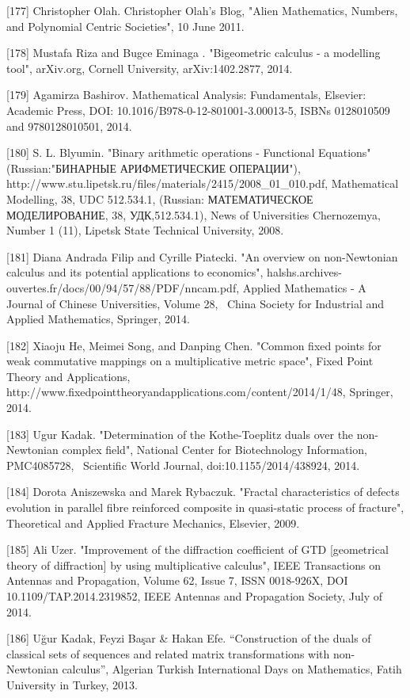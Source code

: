 \documentclass[12pt]{article}
\begin{document}
[177] Christopher Olah. Christopher Olah's Blog, "Alien Mathematics, Numbers, and Polynomial Centric Societies", 10 June 2011.

[178] Mustafa Riza and Bugce Eminaga . "Bigeometric calculus - a modelling tool", arXiv.org, Cornell University, arXiv:1402.2877, 2014.

[179] Agamirza Bashirov. Mathematical Analysis: Fundamentals, Elsevier: Academic Press, DOI: 10.1016/B978-0-12-801001-3.00013-5, ISBNs 0128010509 and 9780128010501, 2014.

[180] S. L. Blyumin. "Binary arithmetic operations - Functional Equations" (Russian:"БИНАРНЫЕ АРИФМЕТИЧЕСКИЕ ОПЕРАЦИИ"), http://www.stu.lipetsk.ru/files/materials/2415/2008_01_010.pdf, Mathematical Modelling, 38, UDC 512.534.1, (Russian: МАТЕМАТИЧЕСКОЕ МОДЕЛИРОВАНИЕ, 38, УДК,512.534.1), News of Universities Chernozemya, Number 1 (11), Lipetsk State Technical University, 2008.

[181] Diana Andrada Filip and Cyrille Piatecki. "An overview on non-Newtonian calculus and its potential applications to economics", halshs.archives-ouvertes.fr/docs/00/94/57/88/PDF/nncam.pdf, Applied Mathematics - A Journal of Chinese Universities, Volume 28,  China Society for Industrial and Applied Mathematics, Springer, 2014.

[182] Xiaoju He, Meimei Song, and Danping Chen. "Common fixed points for weak commutative mappings on a multiplicative metric space", Fixed Point Theory and Applications,  http://www.fixedpointtheoryandapplications.com/content/2014/1/48, Springer, 2014. 

[183] Ugur Kadak. "Determination of the Kothe-Toeplitz duals over the non-Newtonian complex field", National Center for Biotechnology Information, PMC4085728,  Scientific World Journal, doi:10.1155/2014/438924‎, 2014.

[184] Dorota Aniszewska and Marek Rybaczuk. "Fractal characteristics of defects evolution in parallel fibre reinforced composite in quasi-static process of fracture", Theoretical and Applied Fracture Mechanics, Elsevier, 2009.

[185] Ali Uzer. "Improvement of the diffraction coefficient of GTD [geometrical theory of diffraction] by using multiplicative calculus", IEEE Transactions on Antennas and Propagation, Volume 62, Issue 7, ISSN 0018-926X, DOI 10.1109/TAP.2014.2319852, IEEE Antennas and Propagation Society, July of 2014.

[186] Uğur Kadak, Feyzi Başar & Hakan Efe. “Construction of the duals of classical sets of sequences and related matrix transformations with non-Newtonian calculus”, Algerian Turkish International Days on Mathematics, Fatih University in Turkey, 2013.  
\end{document}
